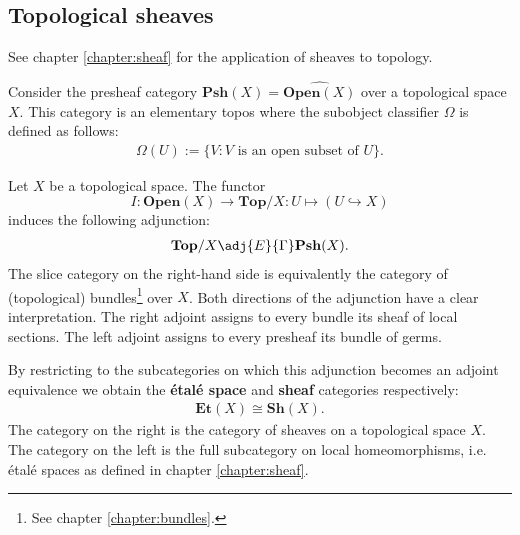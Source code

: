 \subsection{Topological sheaves}

    See chapter \ref{chapter:sheaf} for the application of sheaves to topology.

    \begin{property}\label{topoi:sheaf_topos}
        Consider the presheaf category $\mathbf{Psh}(X) = \widehat{\mathbf{Open}(X)}$ over a topological space $X$. This category is an elementary topos where the subobject classifier $\Omega$ is defined as follows:
        \begin{gather}
            \Omega(U) := \{V:V\text{ is an open subset of }U\}.
        \end{gather}
    \end{property}

    \begin{construct}\label{topos:etale_adjunction}
        Let $X$ be a topological space. The functor \[I:\mathbf{Open}(X)\rightarrow\mathbf{Top}/X:U\mapsto(U\hookrightarrow X)\] induces the following adjunction:
        \begin{gather}
            \mathbf{Top}/X\adj{E}{\Gamma}\mathbf{Psh}(X).
        \end{gather}
        The slice category on the right-hand side is equivalently the category of (topological) bundles\footnote{See chapter \ref{chapter:bundles}.} over $X$. Both directions of the adjunction have a clear interpretation. The right adjoint assigns to every bundle its sheaf of local sections. The left adjoint assigns to every presheaf its bundle of germs.

        By restricting to the subcategories on which this adjunction becomes an adjoint equivalence we obtain the \textbf{\'etal\'e space} and \textbf{sheaf} categories respectively:
        \begin{gather}
            \mathbf{Et}(X)\cong\mathbf{Sh}(X).
        \end{gather}
        The category on the right is the category of sheaves on a topological space $X$. The category on the left is the full subcategory on local homeomorphisms, i.e. \'etal\'e spaces as defined in chapter \ref{chapter:sheaf}.
    \end{construct}

